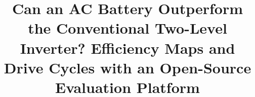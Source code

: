 \documentclass{PCIM-Abstract}
\title{Can an AC Battery Outperform the Conventional Two-Level Inverter? Efficiency Maps and Drive Cycles with an Open-Source Evaluation Platform}
\begin{document}
\printtitle











\printbibliography

\appendix




\end{document}
